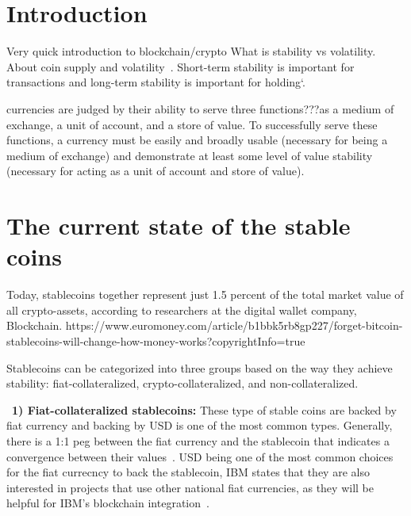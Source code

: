 \section{Introduction}
Very quick introduction to blockchain/crypto
What is stability vs volatility.
About coin supply and volatility~\cite{sams2015note}.
Short-term stability is important for transactions and long-term stability is important for holding`\cite{forbes}.


currencies are judged by their ability to serve three functions???as a medium of exchange, a unit of account, and a store of value. To successfully serve these functions, a currency must be easily and broadly usable (necessary for being a medium of exchange) and demonstrate at least some level of value stability (necessary for acting as a unit of account and store of value).


\section{The current state of the stable coins} %

Today, stablecoins together represent just 1.5 percent of the total market value of all crypto-assets, according to researchers at the digital wallet company, Blockchain.
https://www.euromoney.com/article/b1bbk5rb8gp227/forget-bitcoin-stablecoins-will-change-how-money-works?copyrightInfo=true


Stablecoins can be categorized into three groups based on the way they achieve stability: fiat-collateralized, crypto-collateralized, and non-collateralized.


~\textbf{1) Fiat-collateralized stablecoins:} These type of stable coins are backed by fiat currency and backing by USD is one of the most common types. Generally, there is a 1:1 peg between the fiat currency and the stablecoin that indicates a convergence between their values~\cite{linkedin}. USD being one of the most common choices for the fiat currecncy to back the stablecoin, IBM states that they are also interested in projects that use other national fiat currencies, as they will be helpful for IBM's blockchain integration~\cite{cointelegraph}.


